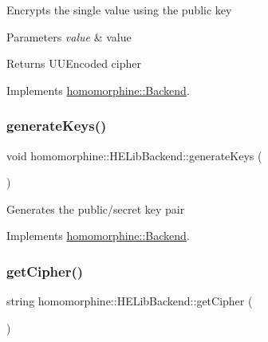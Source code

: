 Encrypts the single value using the public key


\begin{DoxyParams}{Parameters}
{\em value} & value \\
\hline
\end{DoxyParams}
\begin{DoxyReturn}{Returns}
U\+U\+Encoded cipher 
\end{DoxyReturn}


Implements \mbox{\hyperlink{classhomomorphine_1_1_backend_a05ee154a7a5dd88a4a0589165fae9f97}{homomorphine\+::\+Backend}}.

\mbox{\label{classhomomorphine_1_1_h_e_lib_backend_a2c6ed82eeb597b99ae6cdb2734412a0f}} 
\subsubsection{\texorpdfstring{generateKeys()}{generateKeys()}}
{\footnotesize\ttfamily void homomorphine\+::\+H\+E\+Lib\+Backend\+::generate\+Keys (\begin{DoxyParamCaption}{ }\end{DoxyParamCaption})\hspace{0.3cm}{\ttfamily [virtual]}}

Generates the public/secret key pair 

Implements \mbox{\hyperlink{classhomomorphine_1_1_backend_a88cd9469f1394a0a2d15c2f603280763}{homomorphine\+::\+Backend}}.

\mbox{\label{classhomomorphine_1_1_h_e_lib_backend_a9ba4311289e3b8c47f389f4f44de7d5d}} 
\subsubsection{\texorpdfstring{getCipher()}{getCipher()}}
{\footnotesize\ttfamily string homomorphine\+::\+H\+E\+Lib\+Backend\+::get\+Cipher (\begin{DoxyParamCaption}{ }\end{DoxyParamCaption})\hspace{0.3cm}{\ttfamily [virtual]}}

